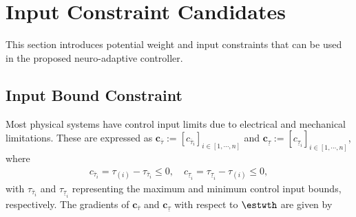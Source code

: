 \documentclass[final,5p,times,twocolumn,authoryear]{elsarticle}
\begin{document}
\appendix

\section{Input Constraint Candidates}\label{sec:appen:cstr} 

This section introduces potential weight and input constraints that can be used in the proposed neuro-adaptive controller. 

\subsection{Input Bound Constraint}\label{sec:appen:cstr:input:bound}

Most physical systems have control input limits due to electrical and mechanical limitations. These are expressed as $\boldsymbol{c}_{\overline \tau}:= [c_{\overline \tau_i}]_{i\in[1,\cdots,n]}$ and $\boldsymbol{c}_{\underline\tau}:= [c_{\underline\tau_i}]_{i\in[1,\cdots,n]}$, where
\begin{equation}
    \begin{aligned}
        c_{\overline \tau_i}=\tau_{(i)} - {\tau_{\overline \tau_i}} \le 0
        ,
        \quad
        c_{\underline\tau_i}={\tau_{\underline\tau_i}}-\tau_{(i)} \le 0
        ,
    \end{aligned}
    \label{eq:cstr:input:bound}
\end{equation}
with $\tau_{\overline \tau_i}$ and $\tau_{\underline\tau_i}$ representing the maximum and minimum control input bounds, respectively.
The gradients of $\boldsymbol{c}_{\overline \tau}$ and $\boldsymbol{c}_{\underline\tau}$ with respect to $\estwth$ are given by
\end{document}
